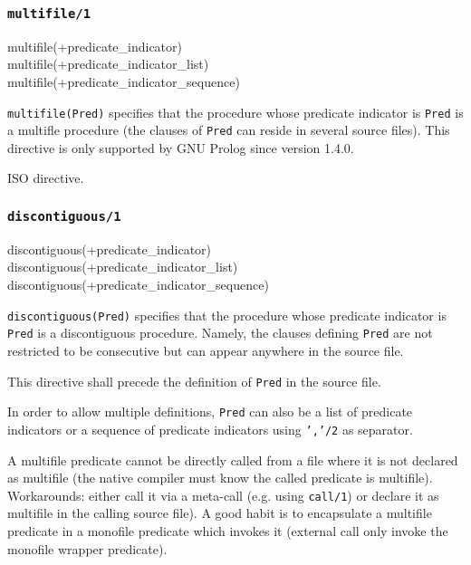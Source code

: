 \subsubsection{\texttt{multifile/1}}

\begin{TemplatesOneCol}
multifile(+predicate\_indicator)\\
multifile(+predicate\_indicator\_list)\\
multifile(+predicate\_indicator\_sequence)

\end{TemplatesOneCol}

\Description

\texttt{multifile(Pred)} specifies that the procedure whose predicate
indicator is \texttt{Pred} is a multifle procedure (the clauses of
\texttt{Pred} can reside in several source files). This directive is only
supported by GNU Prolog since version 1.4.0.

\Portability

ISO directive.

\subsubsection{\texttt{discontiguous/1}}

\begin{TemplatesOneCol}
discontiguous(+predicate\_indicator)\\
discontiguous(+predicate\_indicator\_list)\\
discontiguous(+predicate\_indicator\_sequence)

\end{TemplatesOneCol}

\Description

\texttt{discontiguous(Pred)} specifies that the procedure whose predicate
indicator is \texttt{Pred} is a discontiguous procedure. Namely, the clauses
defining \texttt{Pred} are not restricted to be consecutive but can appear
anywhere in the source file.

This directive shall precede the definition of \texttt{Pred} in the source
file.

In order to allow multiple definitions, \texttt{Pred} can also be a list of
predicate indicators or a sequence of predicate indicators using
\texttt{','/2} as separator.

A multifile predicate cannot be directly called from a file where it is not
declared as multifile (the native compiler must know the called predicate is
multifile). Workarounds: either call it via a meta-call (e.g. using
\texttt{call/1}) or declare it as multifile in the calling source file). A
good habit is to encapsulate a multifile predicate in a monofile predicate
which invokes it (external call only invoke the monofile wrapper predicate).

